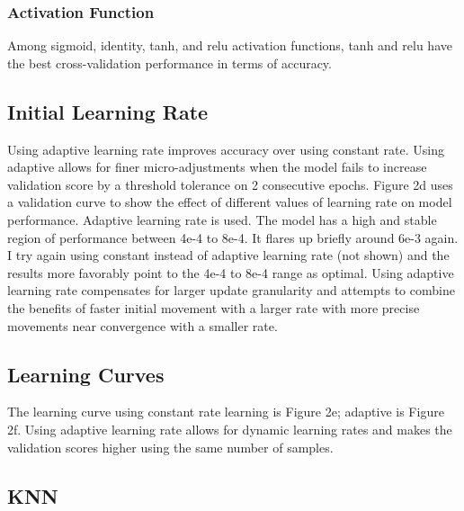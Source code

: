 \documentclass{article}
\begin{document}
\subsubsection*{Activation Function}
Among sigmoid, identity, tanh, and relu activation functions, tanh and relu have the best cross-validation performance in terms of accuracy. 

\subsection*{Initial Learning Rate}
Using adaptive learning rate improves accuracy over using constant rate. Using adaptive allows for finer micro-adjustments when the model fails to increase validation score by a threshold tolerance on 2 consecutive epochs. Figure 2d uses a validation curve to show the effect of different values of learning rate on model performance. Adaptive learning rate is used. The model has a high and stable region of performance between 4e-4 to 8e-4. It flares up briefly around 6e-3 again. I try again using constant instead of adaptive learning rate (not shown) and the results more favorably point to the 4e-4 to 8e-4 range as optimal. Using adaptive learning rate compensates for larger update granularity and attempts to combine the benefits of faster initial movement with a larger rate with more precise movements near convergence with a smaller rate. 

\subsection*{Learning Curves}
The learning curve using constant rate learning is Figure 2e; adaptive is Figure 2f. Using adaptive learning rate allows for dynamic learning rates and makes the validation scores higher using the same number of samples. 

\subsection{KNN}
\end{document}
